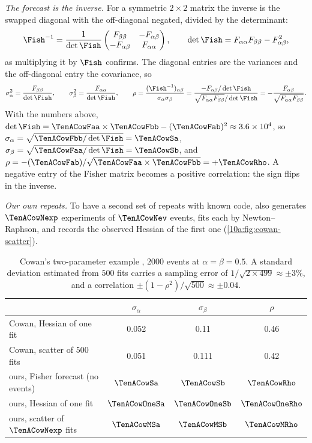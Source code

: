 \emph{The forecast is the inverse.} For a symmetric $2\times2$ matrix the inverse is the swapped diagonal with
the off-diagonal negated, divided by the determinant:
\begin{equation}
  \Fish^{-1}=\frac1{\det\Fish}\begin{pmatrix}F_{\beta\beta}&-F_{\alpha\beta}\\-F_{\alpha\beta}&F_{\alpha\alpha}\end{pmatrix},
  \qquad \det\Fish=F_{\alpha\alpha}F_{\beta\beta}-F_{\alpha\beta}^2 ,
  \label{10a:eq:inv22}
\end{equation}
as multiplying it by $\Fish$ confirms. The diagonal entries are the variances and the off-diagonal entry the
covariance, so
\begin{equation*}
  \sigma_\alpha^2=\frac{F_{\beta\beta}}{\det\Fish},\qquad
  \sigma_\beta^2=\frac{F_{\alpha\alpha}}{\det\Fish},\qquad
  \rho=\frac{(\Fish^{-1})_{\alpha\beta}}{\sigma_\alpha\sigma_\beta}
      =\frac{-F_{\alpha\beta}/\det\Fish}{\sqrt{F_{\alpha\alpha}F_{\beta\beta}}/\det\Fish}
      =-\frac{F_{\alpha\beta}}{\sqrt{F_{\alpha\alpha}F_{\beta\beta}}} .
\end{equation*}
With the numbers above, $\det\Fish=\TenACowFaa\times\TenACowFbb-(\TenACowFab)^2\approx3.6\times10^4$, so
$\sigma_\alpha=\sqrt{\TenACowFbb/\det\Fish}=\TenACowSa$, $\sigma_\beta=\sqrt{\TenACowFaa/\det\Fish}=\TenACowSb$, and
$\rho=-(\TenACowFab)/\sqrt{\TenACowFaa\times\TenACowFbb}=+\TenACowRho$. A negative entry of the
Fisher matrix becomes a positive correlation: the sign flips in the inverse.

\emph{Our own repeats.} To have a second set of repeats with known code,  also
generates $\TenACowNexp$ experiments of $\TenACowNev$ events, fits each by Newton--Raphson, and records the observed
Hessian of the first one (\cref{10a:fig:cowan-scatter}).

\begin{table}[htbp]
\centering
\small
\renewcommand{\arraystretch}{1.15}
\begin{tabular}{@{}l ccc@{}}
\toprule
 & $\sigma_\alpha$ & $\sigma_\beta$ & $\rho$\\\midrule
Cowan, Hessian of one fit & 0.052 & 0.11 & 0.46\\
Cowan, scatter of $500$ fits & 0.051 & 0.111 & 0.42\\
ours, Fisher forecast (no events) & $\TenACowSa$ & $\TenACowSb$ & $\TenACowRho$\\
ours, Hessian of one fit & $\TenACowOneSa$ & $\TenACowOneSb$ & $\TenACowOneRho$\\
ours, scatter of $\TenACowNexp$ fits & $\TenACowMSa$ & $\TenACowMSb$ & $\TenACowMRho$\\
\bottomrule
\end{tabular}
\caption{Cowan's two-parameter example , $2000$ events at $\alpha=\beta=0.5$. A standard
deviation estimated from $500$ fits carries a sampling error of $1/\sqrt{2\times499}\approx\pm3\%$, and a correlation
$\pm(1-\rho^2)/\sqrt{500}\approx\pm0.04$.}
\label{10a:tab:cowan}
\end{table}


